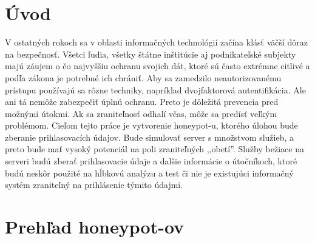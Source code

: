 \documentclass[12pt, oneside]{book}
\begin{document}

%
%



\newpage 
\tableofcontents






\mainmatter

\chapter*{Úvod}

V ostatných rokoch sa v oblasti informačných technológií začína klásť väčší dôraz na bezpečnosť.
Všetci ľudia, všetky štátne inštitúcie aj podnikateľské subjekty majú záujem o čo najvyššiu ochranu svojich dát, ktoré sú často extrémne citlivé a podľa zákona je potrebné ich chrániť.
Aby sa zamedzilo neautorizovanému prístupu používajú sa rôzne techniky, napríklad dvojfaktorová autentifikácia.
Ale ani tá nemôže zabezpečiť úplnú ochranu.
Preto je dôležitá prevencia pred možnými útokmi.
Ak sa zraniteľnosť odhalí včas, môže sa predísť veľkým problémom.
Cieľom tejto práce je vytvorenie honeypot-u, ktorého úlohou bude zberanie prihlasovacích údajov.
Bude simulovať server s množstvom služieb, a preto bude mať vysoký potenciál na poli zraniteľných ,,obetí''.
Služby bežiace na serveri budú zberať prihlasovacie údaje a dalšie informácie o útočníkoch, ktoré budú neskôr použité na hĺbkovú analýzu a test či nie je existujúci informačný systém zraniteľný na prihlásenie týmito údajmi.

\chapter{Prehľad honeypot-ov}
\end{document}
